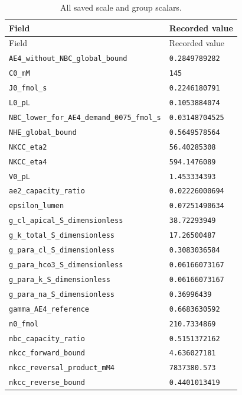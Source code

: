 \begingroup\scriptsize
\setlength{\tabcolsep}{3pt}
\begin{longtable}{p{.46\linewidth}p{.46\linewidth}}
\caption{All saved scale and group scalars.}\\
\toprule
Field & Recorded value \\
\midrule\endfirsthead
\toprule
Field & Recorded value \\
\midrule\endhead
\bottomrule\endfoot
\nolinkurl{AE4_without_NBC_global_bound} & \texttt{0.2849789282} \\
\nolinkurl{C0_mM} & \texttt{145} \\
\nolinkurl{J0_fmol_s} & \texttt{0.2246180791} \\
\nolinkurl{L0_pL} & \texttt{0.1053884074} \\
\nolinkurl{NBC_lower_for_AE4_demand_0075_fmol_s} & \texttt{0.03148704525} \\
\nolinkurl{NHE_global_bound} & \texttt{0.5649578564} \\
\nolinkurl{NKCC_eta2} & \texttt{56.40285308} \\
\nolinkurl{NKCC_eta4} & \texttt{594.1476089} \\
\nolinkurl{V0_pL} & \texttt{1.453334393} \\
\nolinkurl{ae2_capacity_ratio} & \texttt{0.02226000694} \\
\nolinkurl{epsilon_lumen} & \texttt{0.07251490634} \\
\nolinkurl{g_cl_apical_S_dimensionless} & \texttt{38.72293949} \\
\nolinkurl{g_k_total_S_dimensionless} & \texttt{17.26500487} \\
\nolinkurl{g_para_cl_S_dimensionless} & \texttt{0.3083036584} \\
\nolinkurl{g_para_hco3_S_dimensionless} & \texttt{0.06166073167} \\
\nolinkurl{g_para_k_S_dimensionless} & \texttt{0.06166073167} \\
\nolinkurl{g_para_na_S_dimensionless} & \texttt{0.36996439} \\
\nolinkurl{gamma_AE4_reference} & \texttt{0.6683630592} \\
\nolinkurl{n0_fmol} & \texttt{210.7334869} \\
\nolinkurl{nbc_capacity_ratio} & \texttt{0.5151372162} \\
\nolinkurl{nkcc_forward_bound} & \texttt{4.636027181} \\
\nolinkurl{nkcc_reversal_product_mM4} & \texttt{7837380.573} \\
\nolinkurl{nkcc_reverse_bound} & \texttt{0.4401013419} \\

\end{longtable}

